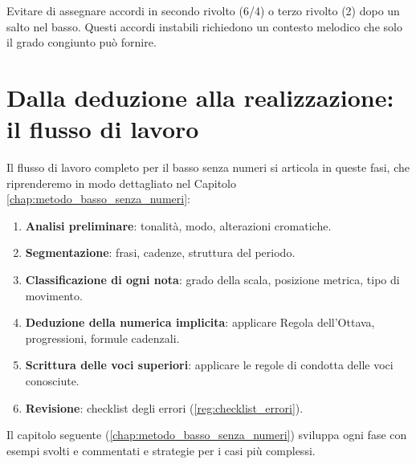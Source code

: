 \begin{errore}
	\label{err:rivoltato_dopo_salto}
	Evitare di assegnare accordi in secondo rivolto (6/4) o terzo rivolto (2) dopo un salto nel basso. Questi accordi instabili richiedono un contesto melodico che solo il grado congiunto può fornire.
\end{errore}

\section{Dalla deduzione alla realizzazione: il flusso di lavoro}
\label{sec:flusso_lavoro_basso_senza_numeri}

Il flusso di lavoro completo per il basso senza numeri si articola in queste fasi, che riprenderemo in modo dettagliato nel Capitolo \ref{chap:metodo_basso_senza_numeri}:

\begin{enumerate}
	\item \textbf{Analisi preliminare}: tonalità, modo, alterazioni cromatiche.
	\item \textbf{Segmentazione}: frasi, cadenze, struttura del periodo.
	\item \textbf{Classificazione di ogni nota}: grado della scala, posizione metrica, tipo di movimento.
	\item \textbf{Deduzione della numerica implicita}: applicare Regola dell'Ottava, progressioni, formule cadenzali.
	\item \textbf{Scrittura delle voci superiori}: applicare le regole di condotta delle voci conosciute.
	\item \textbf{Revisione}: checklist degli errori (\ref{reg:checklist_errori}).
\end{enumerate}

Il capitolo seguente (\ref{chap:metodo_basso_senza_numeri}) sviluppa ogni fase con esempi svolti e commentati e strategie per i casi più complessi.
